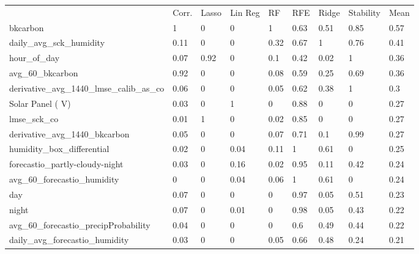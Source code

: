 \begin{table}[]
\centering
\small
\begin{tabular}{lllllllll}
\\
\\
\toprule
     & Corr. & Lasso & Lin Reg & RF   & RFE  & Ridge & Stability & Mean \\
\midrule
bkcarbon                                   & 1     & 0          & 0    & 1    & 0.63  & 0.51      & 0.85 & 0.57 \\
daily\_avg\_sck\_humidity                  & 0.11  & 0          & 0    & 0.32 & 0.67  & 1         & 0.76 & 0.41 \\
hour\_of\_day                              & 0.07  & 0.92       & 0    & 0.1  & 0.42  & 0.02      & 1    & 0.36 \\
avg\_60\_bkcarbon                          & 0.92  & 0          & 0    & 0.08 & 0.59  & 0.25      & 0.69 & 0.36 \\
derivative\_avg\_1440\_lmse\_calib\_as\_co & 0.06  & 0          & 0    & 0.05 & 0.62  & 0.38      & 1    & 0.3  \\
Solar Panel ( V)                           & 0.03  & 0          & 1    & 0    & 0.88  & 0         & 0    & 0.27 \\
lmse\_sck\_co                              & 0.01  & 1          & 0    & 0.02 & 0.85  & 0         & 0    & 0.27 \\
derivative\_avg\_1440\_bkcarbon            & 0.05  & 0          & 0    & 0.07 & 0.71  & 0.1       & 0.99 & 0.27 \\
humidity\_box\_differential                & 0.02  & 0          & 0.04 & 0.11 & 1     & 0.61      & 0    & 0.25 \\
forecastio\_partly-cloudy-night            & 0.03  & 0          & 0.16 & 0.02 & 0.95  & 0.11      & 0.42 & 0.24 \\
avg\_60\_forecastio\_humidity              & 0     & 0          & 0.04 & 0.06 & 1     & 0.61      & 0    & 0.24 \\
day                                        & 0.07  & 0          & 0    & 0    & 0.97  & 0.05      & 0.51 & 0.23 \\
night                                      & 0.07  & 0          & 0.01 & 0    & 0.98  & 0.05      & 0.43 & 0.22 \\
avg\_60\_forecastio\_precipProbability     & 0.04  & 0          & 0    & 0    & 0.6   & 0.49      & 0.44 & 0.22 \\
daily\_avg\_forecastio\_humidity           & 0.03  & 0          & 0    & 0.05 & 0.66  & 0.48      & 0.24 & 0.21 \\

\end{tabular}
\end{table}
